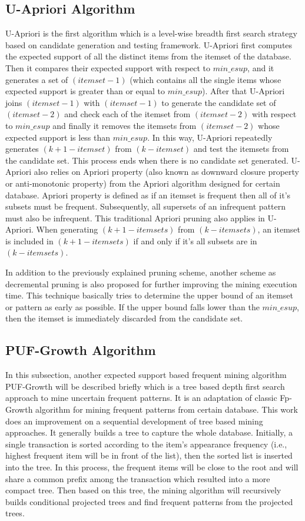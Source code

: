 \subsection{U-Apriori Algorithm}
U-Apriori \cite{Chui2007} is the first algorithm which is a level-wise breadth first search strategy based on candidate generation and testing framework. U-Apriori first computes the expected support of all the distinct items from the itemset of the database. Then it compares their expected support with respect to $min\_esup$, and it generates a set of $(itemset-1)$ (which contains all the single items whose expected support is greater than or equal to $min\_esup$). After that U-Apriori joins $(itemset-1)$ with $(itemset-1)$ to generate the candidate set of $(itemset-2)$ and check each of the itemset from $(itemset-2)$ with respect to $min\_esup$ and finally it removes the itemsets from $(itemset-2)$ whose expected support is less than $min\_esup$. In this way, U-Apriori repeatedly generates $(k+1-itemset)$ from $(k-itemset)$ and test the itemsets from the candidate set. This process ends when there is no candidate set generated. U-Apriori also relies on Apriori property (also known as downward closure property or anti-monotonic property) from the Apriori algorithm designed for certain database. Apriori property is defined as if an itemset is frequent then all of it's subsets must be frequent. Subsequently, all supersets of an infrequent pattern must also be infrequent. This traditional Apriori pruning also applies in U-Apriori. When generating $(k+1-itemsets)$ from $(k-itemsets)$, an itemset is included in $(k+1-itemsets)$ if and only if it's all subsets are in $(k-itemsets)$.

In addition to the previously explained pruning scheme, another scheme as decremental pruning is also proposed for further improving the mining execution time. This technique basically tries to determine the upper bound of an itemset or pattern as early as possible. If the upper bound falls lower than the $min\_esup$, then the itemset is immediately discarded from the candidate set.

\subsection{PUF-Growth Algorithm}
In this subsection, another expected support based frequent mining algorithm PUF-Growth \cite{Leung2013} will be described briefly which is a tree based depth first search approach to mine uncertain frequent patterns. It is an adaptation of classic Fp-Growth algorithm for mining frequent patterns from certain database. This work does an improvement on a sequential development of tree based mining approaches. It generally builds a tree to capture the whole database. Initially, a single transaction is sorted according to the item's appearance frequency (i.e., highest frequent item will be in front of the list), then the sorted list is inserted into the tree. In this process, the frequent items will be close to the root and will share a common prefix among the transaction which resulted into a more compact tree. Then based on this tree, the mining algorithm will recursively builds conditional  projected trees and find frequent patterns from the projected trees.

